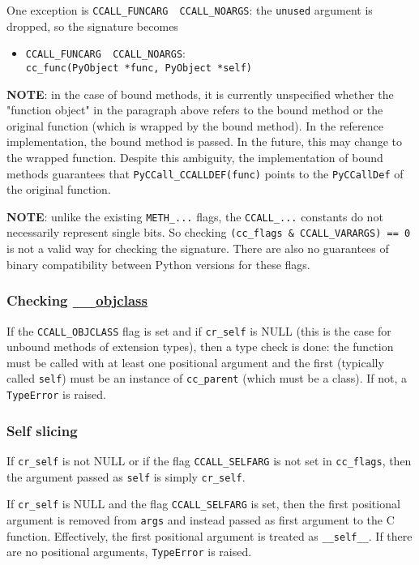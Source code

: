 One exception is \texttt{CCALL\_FUNCARG\ \textbar{}\ CCALL\_NOARGS}: the
\texttt{unused} argument is dropped, so the signature becomes

\begin{itemize}
\tightlist
\item
  \texttt{CCALL\_FUNCARG\ \textbar{}\ CCALL\_NOARGS}:
  \texttt{cc\_func(PyObject\ *func,\ PyObject\ *self)}
\end{itemize}

\textbf{NOTE}: in the case of bound methods, it is currently unspecified
whether the "function object" in the paragraph above refers to the bound
method or the original function (which is wrapped by the bound method).
In the reference implementation, the bound method is passed. In the
future, this may change to the wrapped function. Despite this ambiguity,
the implementation of bound methods guarantees that
\texttt{PyCCall\_CCALLDEF(func)} points to the \texttt{PyCCallDef} of
the original function.

\textbf{NOTE}: unlike the existing \texttt{METH\_...} flags, the
\texttt{CCALL\_...} constants do not necessarily represent single bits.
So checking \texttt{(cc\_flags\ \&\ CCALL\_VARARGS)\ ==\ 0} is not a
valid way for checking the signature. There are also no guarantees of
binary compatibility between Python versions for these flags.

\subsubsection{\texorpdfstring{Checking
\_\_\href{name__\%20attribute}{objclass}}{Checking \_\_objclass}}

If the \texttt{CCALL\_OBJCLASS} flag is set and if \texttt{cr\_self} is
NULL (this is the case for unbound methods of extension types), then a
type check is done: the function must be called with at least one
positional argument and the first (typically called \texttt{self}) must
be an instance of \texttt{cc\_parent} (which must be a class). If not, a
\texttt{TypeError} is raised.

\subsubsection{Self slicing}

If \texttt{cr\_self} is not NULL or if the flag \texttt{CCALL\_SELFARG}
is not set in \texttt{cc\_flags}, then the argument passed as
\texttt{self} is simply \texttt{cr\_self}.

If \texttt{cr\_self} is NULL and the flag \texttt{CCALL\_SELFARG} is
set, then the first positional argument is removed from \texttt{args}
and instead passed as first argument to the C function. Effectively, the
first positional argument is treated as \texttt{\_\_self\_\_}. If there
are no positional arguments, \texttt{TypeError} is raised.

